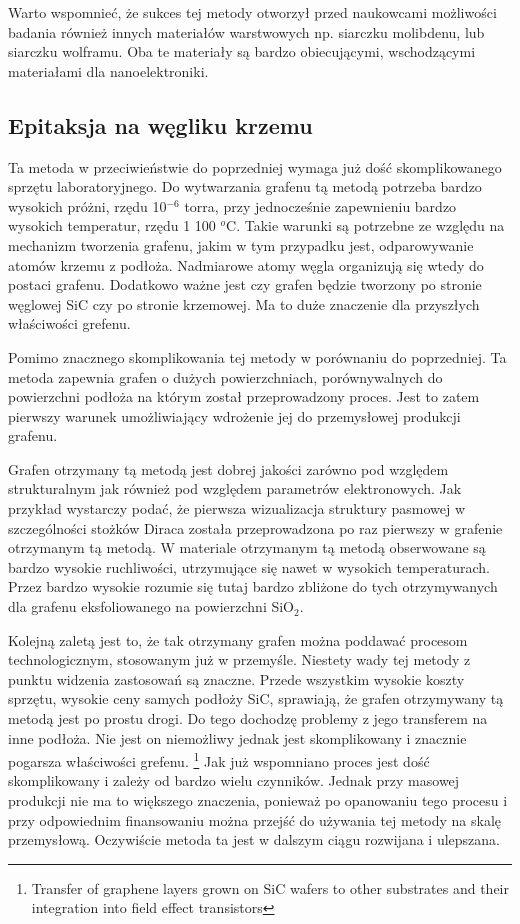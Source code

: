 	Warto wspomnieć, że sukces tej metody otworzył przed naukowcami możliwości badania również innych 
	materiałów warstwowych np. siarczku molibdenu, lub siarczku wolframu. Oba te materiały są bardzo
	obiecującymi, wschodzącymi materiałami dla nanoelektroniki.


	\subsection{Epitaksja na węgliku krzemu}

	Ta metoda w przeciwieństwie do poprzedniej wymaga już dość skomplikowanego sprzętu laboratoryjnego. 
	Do wytwarzania grafenu tą metodą potrzeba bardzo wysokich próżni, rzędu 10$^{-6}$ torra, przy jednocześnie
	zapewnieniu bardzo wysokich temperatur, rzędu 1 100 $^o$C. Takie warunki są potrzebne ze względu
	na mechanizm tworzenia grafenu, jakim w tym przypadku jest, odparowywanie atomów krzemu z podłoża. 
	Nadmiarowe atomy węgla organizują się wtedy do postaci grafenu. Dodatkowo ważne jest czy grafen będzie tworzony
	po stronie węglowej SiC czy po stronie krzemowej. Ma to duże znaczenie dla przyszłych właściwości grefenu.
		
	Pomimo znacznego skomplikowania tej metody w porównaniu do poprzedniej. Ta metoda zapewnia grafen o dużych
	powierzchniach, porównywalnych do powierzchni podłoża na którym został przeprowadzony proces.
	Jest to zatem pierwszy warunek umożliwiający wdrożenie jej do przemysłowej produkcji grafenu.

	Grafen otrzymany tą metodą jest dobrej jakości zarówno pod względem strukturalnym jak również pod względem
	parametrów elektronowych. Jak przykład wystarczy podać, że pierwsza wizualizacja struktury pasmowej
	w szczególności stożków Diraca została przeprowadzona po raz pierwszy w grafenie otrzymanym tą metodą.
	W materiale otrzymanym tą metodą obserwowane są bardzo wysokie ruchliwości, utrzymujące się nawet 
	w wysokich temperaturach. Przez bardzo wysokie rozumie się tutaj bardzo zbliżone do tych otrzymywanych 
	dla grafenu eksfoliowanego na powierzchni SiO$_2$.

	Kolejną zaletą jest to, że tak  otrzymany grafen można poddawać procesom technologicznym, stosowanym 
	już w przemyśle. Niestety wady tej metody z punktu widzenia zastosowań są znaczne. Przede wszystkim
	wysokie koszty sprzętu, wysokie ceny samych podłoży SiC, sprawiają, że grafen otrzymywany tą metodą jest
	po prostu drogi. Do tego dochodzę problemy z jego transferem na inne podłoża. Nie jest on niemożliwy
	jednak jest skomplikowany i znacznie pogarsza właściwości grefenu. \footnote{Transfer of graphene layers grown on SiC wafers to other substrates and their integration into field effect transistors}
	Jak już wspomniano proces jest dość skomplikowany i zależy od bardzo wielu czynników. Jednak przy masowej
	produkcji nie ma to większego znaczenia, ponieważ po opanowaniu tego procesu i przy odpowiednim finansowaniu
	można przejść do używania tej metody na skalę przemysłową. Oczywiście metoda ta jest w dalszym ciągu rozwijana
	i ulepszana.

